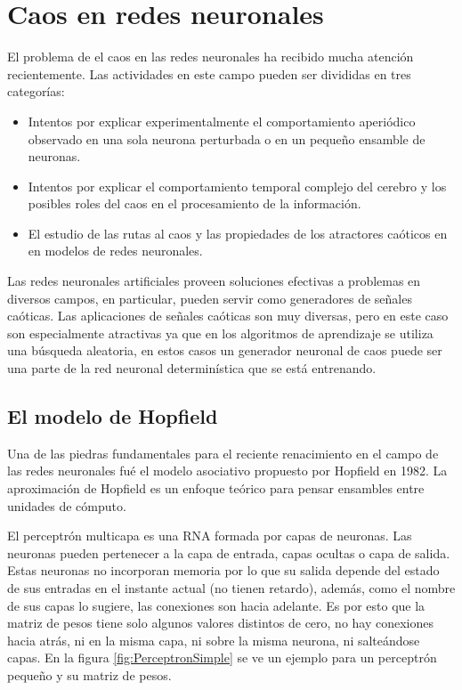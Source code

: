 \section{Caos en redes neuronales}

El problema de el caos en las redes neuronales ha recibido mucha atención recientemente.
Las actividades en este campo pueden ser divididas en tres categorías:
\begin{itemize}
	\item Intentos por explicar experimentalmente el comportamiento aperiódico observado en una sola neurona perturbada o en un pequeño ensamble de neuronas.
	\item Intentos por explicar el comportamiento temporal complejo del cerebro y los posibles	roles del caos en el procesamiento de la información.
	\item El estudio de las rutas al caos y las propiedades de los atractores caóticos en en modelos de redes neuronales.
\end{itemize}

Las redes neuronales artificiales proveen soluciones efectivas a problemas en diversos campos, en particular, pueden servir como generadores de señales caóticas.
Las aplicaciones de señales caóticas son muy diversas, pero en este caso son especialmente atractivas ya que en los algoritmos de aprendizaje se utiliza una búsqueda aleatoria, en estos casos un generador neuronal de caos puede ser una parte de la red neuronal determinística que se está entrenando.

\subsection{El modelo de Hopfield}

Una de las piedras fundamentales para el reciente renacimiento en el campo de las redes neuronales fué el modelo asociativo propuesto por Hopfield en 1982.
La aproximación de Hopfield es un enfoque teórico para pensar ensambles entre unidades de cómputo.

El perceptrón multicapa es una RNA formada por capas de neuronas.
Las neuronas pueden pertenecer a la capa de entrada, capas ocultas o capa de salida.
Estas neuronas no incorporan memoria por lo que su salida depende del estado de sus entradas en el instante actual (no tienen retardo), además, como el nombre de sus capas lo sugiere, las conexiones son hacia adelante.
Es por esto que la matriz de pesos tiene solo algunos valores distintos de cero, no hay conexiones hacia atrás, ni en la misma capa, ni sobre la misma neurona,
ni salteándose capas.
En la figura \ref{fig:PerceptronSimple} se ve un ejemplo para un perceptrón pequeño y su matriz de pesos.

